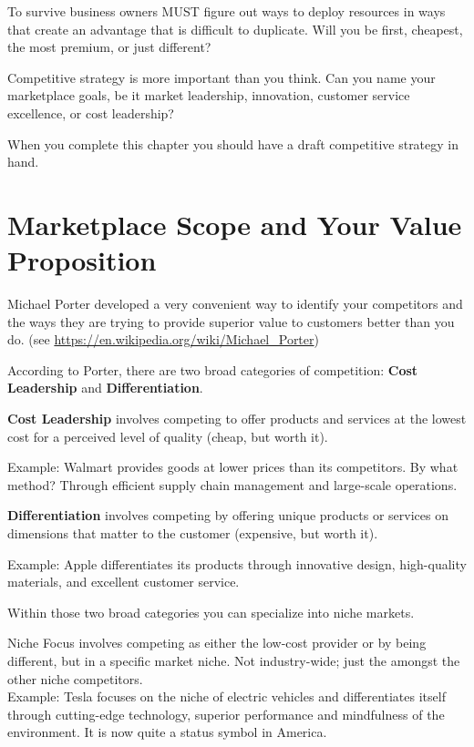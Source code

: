 \documentclass[
]{book}
\begin{document}
To survive business owners MUST figure out ways to deploy resources in ways that create an advantage that is difficult to duplicate. Will you be first, cheapest, the most premium, or just different?

Competitive strategy is more important than you think. Can you name your marketplace goals, be it market leadership, innovation, customer service excellence, or cost leadership?

When you complete this chapter you should have a draft competitive strategy in hand.

\hypertarget{marketplace-scope-and-your-value-proposition}{%
\section{Marketplace Scope and Your Value Proposition}\label{marketplace-scope-and-your-value-proposition}}

Michael Porter developed a very convenient way to identify your competitors and the ways they are trying to provide superior value to customers better than you do. (see \url{https://en.wikipedia.org/wiki/Michael_Porter})

According to Porter, there are two broad categories of competition: {\textbf{Cost Leadership}} and {\textbf{Differentiation}}.

{\textbf{Cost Leadership}} involves competing to offer products and services at the lowest cost for a perceived level of quality (cheap, but worth it).

Example: Walmart provides goods at lower prices than its competitors.
By what method? Through efficient supply chain management and large-scale operations.

{\textbf{Differentiation}} involves competing by offering unique products or services on dimensions that matter to the customer (expensive, but worth it).

Example: Apple differentiates its products through innovative design, high-quality materials, and excellent customer service.

Within those two broad categories you can specialize into niche markets.

{Niche Focus} involves competing as either the low-cost provider or by being different, but in a specific market niche. Not industry-wide; just the amongst the other niche competitors.\\

Example: Tesla focuses on the niche of electric vehicles and differentiates itself through cutting-edge technology, superior performance and mindfulness of the environment. It is now quite a status symbol in America.
\end{document}
